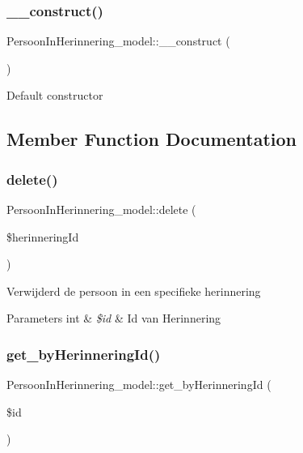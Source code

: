 \subsubsection{\texorpdfstring{\+\_\+\+\_\+construct()}{\_\_construct()}}
{\footnotesize\ttfamily Persoon\+In\+Herinnering\+\_\+model\+::\+\_\+\+\_\+construct (\begin{DoxyParamCaption}{ }\end{DoxyParamCaption})}

Default constructor 

\subsection{Member Function Documentation}
\mbox{\label{class_persoon_in_herinnering__model_acdf0cb89162001b81f64a36eb8bd7663}} 
\subsubsection{\texorpdfstring{delete()}{delete()}}
{\footnotesize\ttfamily Persoon\+In\+Herinnering\+\_\+model\+::delete (\begin{DoxyParamCaption}\item[{}]{\$herinnering\+Id }\end{DoxyParamCaption})}

Verwijderd de persoon in een specifieke herinnering 
\begin{DoxyParams}[1]{Parameters}
int & {\em \$id} & Id van Herinnering \\
\hline
\end{DoxyParams}
\mbox{\label{class_persoon_in_herinnering__model_aae7c684767759ee244cf1e190a516952}} 
\subsubsection{\texorpdfstring{get\+\_\+by\+Herinnering\+Id()}{get\_byHerinneringId()}}
{\footnotesize\ttfamily Persoon\+In\+Herinnering\+\_\+model\+::get\+\_\+by\+Herinnering\+Id (\begin{DoxyParamCaption}\item[{}]{\$id }\end{DoxyParamCaption})}

